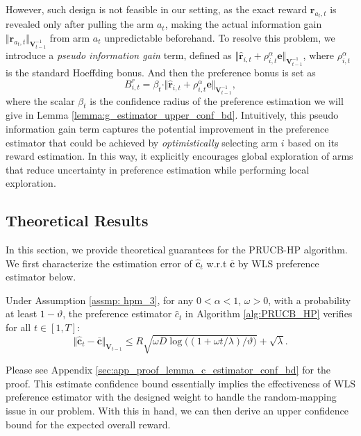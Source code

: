 However, such design is not feasible in our setting, as the exact reward $\boldsymbol{r}_{a_t,t}$ is revealed only after pulling the arm $a_t$, making the actual information gain $\Vert \boldsymbol{r}_{a_t,t} \Vert_{\boldsymbol{V}^{-1}_{t-1}}$ from arm $a_t$ unpredictable beforehand.
To resolve this problem, we introduce a \emph{pseudo information gain} term, defined as $\Vert \boldsymbol{\hat{r}}_{i,t} + \rho_{i,t}^{\alpha} \boldsymbol{e} \Vert_{\boldsymbol{V}^{-1}_{t-1}}$, where $\rho_{i,t}^{\alpha}$ is the standard Hoeffding bonus. And then the preference bonus is set as 
\begin{equation}
B_{i,t}^{r} = \beta_t \cdot \Vert \boldsymbol{\hat{r}}_{i,t} + \rho_{i,t}^{\alpha} \boldsymbol{e} \Vert_{\boldsymbol{V}^{-1}_{t-1}},
\end{equation}
where the scalar $\beta_t$ is the confidence radius of the preference estimation we will give in Lemma \ref{lemma:g_estimator_upper_conf_bd}.
Intuitively, this pseudo information gain term captures the potential improvement in the preference estimator that could be achieved by \emph{optimistically} selecting arm $i$ based on its reward estimation.
In this way, it explicitly encourages global exploration of arms that reduce uncertainty in preference estimation while performing local exploration.

\subsection{Theoretical Results}
\label{sec:theoretical_result_hidden}

In this section, we provide theoretical guarantees for the PRUCB-HP algorithm.
We first characterize the estimation error of $\boldsymbol{\hat{c}}_t$ w.r.t $\overline{\boldsymbol{c}}$ by WLS preference estimator below.

\begin{lemma}
\label{lemma:c_estimator_conf_bd}
Under Assumption \ref{assmp: hpm_3}, for any $0 < \alpha <1$, $\omega>0$, with a probability at least $1-\vartheta$, the preference estimator $\hat{c}_t$ in Algorithm \ref{alg:PRUCB_HP} verifies for all $t \in [1,T]$:
\[
\Vert \hat{\boldsymbol{c}}_t - \boldsymbol{\overline{c}} \Vert_{\boldsymbol{V}_{t-1}} 
\leq
R \sqrt{\omega D \log\big((1 + \omega t/\lambda)/\vartheta\big)} + \sqrt{\lambda}.
\]
\end{lemma}
Please see Appendix \ref{sec:app_proof_lemma_c_estimator_conf_bd} for the proof. This estimate confidence bound essentially implies the effectiveness of WLS preference estimator with the designed weight to handle the random-mapping issue in our problem. With this in hand, we can then derive an upper confidence bound for the expected overall reward.

